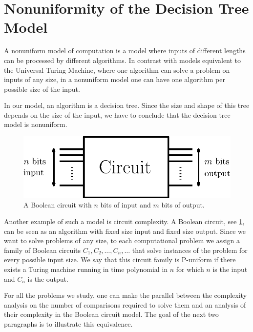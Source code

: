 \section{Nonuniformity of the Decision Tree Model}
\label{tree:sorting:nonuniformity}

A nonuniform model of computation is a model where inputs of different lengths
can be processed by different algorithms. In contrast with models equivalent to
the Universal Turing Machine, where one algorithm can solve a problem on inputs
of any size, in a nonuniform model one can have one algorithm per possible size
of the input.

In our model, an algorithm is a decision tree. Since the size and shape of
this tree depends on the size of the input, we have to conclude that the
decision tree model is nonuniform.

\begin{figure}
\center
\includegraphics[height=0.12\textheight]{fig/sorting/model/circuit}
\caption{A Boolean circuit with \(n\) bits of input and \(m\) bits of output.}
\label{fig:sorting:nonuniformity:circuit}
\end{figure}

Another example of such a model is circuit complexity. A Boolean circuit,
see \ref{fig:sorting:nonuniformity:circuit}, can be seen as an algorithm with
fixed size input and fixed size output. Since we want to solve problems of any
size, to each computational problem we assign a family of Boolean circuits
\(C_1,C_2,\ldots,C_n,\ldots\) that solve instances of the problem for every
possible input size. We say that this circuit family is P-uniform if there
exists a Turing machine running in time polynomial in \(n\) for which \(n\) is
the input and \(C_n\) is the output.

For all the problems we study, one can make the parallel between the
complexity analysis on the number of comparisons required to solve them and an
analysis of their complexity in the Boolean circuit model. The goal of the
next two paragraphs is to illustrate this equivalence.

